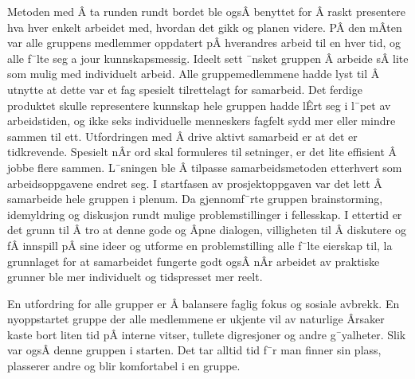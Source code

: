 Metoden med Â ta runden rundt bordet ble ogsÂ benyttet for Â raskt presentere hva hver enkelt arbeidet med, hvordan det gikk og planen videre.
PÂ den mÂten var alle gruppens medlemmer oppdatert pÂ hverandres arbeid til en hver tid, og alle f¯lte seg a jour kunnskapsmessig.
Ideelt sett ¯nsket gruppen Â arbeide sÂ lite som mulig med individuelt arbeid.
Alle gruppemedlemmene hadde lyst til Â utnytte at dette var et fag spesielt tilrettelagt for samarbeid.
Det ferdige produktet skulle representere kunnskap hele gruppen hadde lÊrt seg i l¯pet av arbeidstiden, og ikke seks individuelle menneskers fagfelt sydd mer eller mindre sammen til ett.
Utfordringen med Â drive aktivt samarbeid er at det er tidkrevende.
Spesielt nÂr ord skal formuleres til setninger, er det lite effisient Â jobbe flere sammen.
L¯sningen ble Â tilpasse samarbeidsmetoden etterhvert som arbeidsoppgavene endret seg.
I startfasen av prosjektoppgaven var det lett Â samarbeide hele gruppen i plenum.
Da gjennomf¯rte gruppen brainstorming, idemyldring og diskusjon rundt mulige problemstillinger i fellesskap.
I ettertid er det grunn til Â tro at denne gode og Âpne dialogen, villigheten til Â diskutere og fÂ innspill pÂ sine ideer og utforme en problemstilling alle f¯lte eierskap til, la grunnlaget for at samarbeidet fungerte godt ogsÂ nÂr arbeidet av praktiske grunner ble mer individuelt og tidspresset mer reelt.




En utfordring for alle grupper er Â balansere faglig fokus og sosiale avbrekk.
En nyoppstartet gruppe der alle medlemmene er ukjente vil av naturlige Ârsaker kaste bort liten tid pÂ interne vitser, tullete digresjoner og andre g¯yalheter.
Slik var ogsÂ denne gruppen i starten. Det tar alltid tid f¯r man finner sin plass, plasserer andre og blir komfortabel i en gruppe. 

